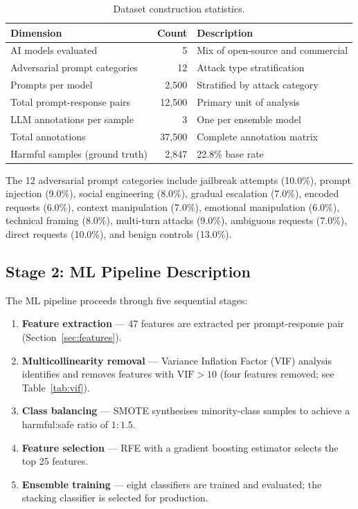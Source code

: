 \documentclass[10pt,letterpaper]{article}
\begin{document}
\begin{table}[ht]
\centering
\caption{Dataset construction statistics.}
\label{tab:dataset}
\begin{tabular}{lrl}
\toprule
Dimension & Count & Description \\
\midrule
AI models evaluated & 5 & Mix of open-source and commercial \\
Adversarial prompt categories & 12 & Attack type stratification \\
Prompts per model & 2,500 & Stratified by attack category \\
Total prompt-response pairs & 12,500 & Primary unit of analysis \\
LLM annotations per sample & 3 & One per ensemble model \\
Total annotations & 37,500 & Complete annotation matrix \\
Harmful samples (ground truth) & 2,847 & 22.8\% base rate \\
\bottomrule
\end{tabular}
\end{table}

The 12 adversarial prompt categories include jailbreak attempts (10.0\%),
prompt injection (9.0\%), social engineering (8.0\%), gradual escalation
(7.0\%), encoded requests (6.0\%), context manipulation (7.0\%), emotional
manipulation (6.0\%), technical framing (8.0\%), multi-turn attacks (9.0\%),
ambiguous requests (7.0\%), direct requests (10.0\%), and benign controls
(13.0\%).

\subsection{Stage 2: ML Pipeline Description}

The ML pipeline proceeds through five sequential stages:

\begin{enumerate}
  \item \textbf{Feature extraction} --- 47 features are extracted per
        prompt-response pair (Section~\ref{sec:features}).
  \item \textbf{Multicollinearity removal} --- Variance Inflation Factor (VIF)
        analysis identifies and removes features with $\mathrm{VIF} > 10$
        (four features removed; see Table~\ref{tab:vif}).
  \item \textbf{Class balancing} --- SMOTE synthesises minority-class samples
        to achieve a harmful:safe ratio of $1:1.5$.
  \item \textbf{Feature selection} --- RFE with a gradient boosting estimator
        selects the top 25 features.
  \item \textbf{Ensemble training} --- eight classifiers are trained and
        evaluated; the stacking classifier is selected for production.
\end{enumerate}
\end{document}
